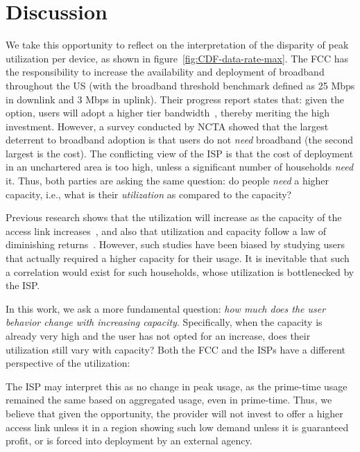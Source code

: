 \section{Discussion}\label{sec:discussion}

We take this opportunity to reflect on the
interpretation of the disparity of peak utilization per device, as shown in
figure~\ref{fig:CDF-data-rate-max}. The FCC has the responsibility to increase 
the availability and deployment of broadband
throughout the US (with the broadband threshold benchmark defined as 25 Mbps in downlink and
3 Mbps in uplink). Their progress report states that: given the option, users will adopt a
higher tier bandwidth~\cite{}, thereby meriting the high investment. However, a survey
conducted by NCTA showed that the largest deterrent to broadband adoption is that users
do not \emph{need} broadband (the second largest is the cost). The conflicting view of 
the ISP is that the cost of deployment in an unchartered area is too high, unless
a significant number of households \emph{need} it. Thus, both parties are asking the same
question: do people \emph{need} a higher capacity, i.e., what is their \emph{utilization}
as compared to the capacity?

Previous research shows that the utilization will increase as the capacity of the access
link increases~\cite{}, and also that utilization and capacity
follow a law of diminishing returns~\cite{dasu-imc2014}. However, such
studies have been biased by studying users that actually required a higher capacity
for their usage. It is inevitable that such a correlation would exist for 
such households, whose utilization is bottlenecked by the ISP.

In this work, we ask a more fundamental question: \emph{how much does the user behavior
change with increasing capacity}. Specifically, when the capacity is already very high
and the user has not opted for an increase, does their utilization still vary with capacity?
Both the FCC and the ISPs have a different perspective of the utilization:

 The ISP may interpret this as no change in 
peak usage, as
the prime-time usage remained the same based on aggregated usage, even in 
prime-time. Thus, we
believe that given the opportunity, the provider will not invest to offer a 
higher access
link unless it in a region showing such low demand unless it is guaranteed 
profit, or is forced
into deployment by an external agency.

